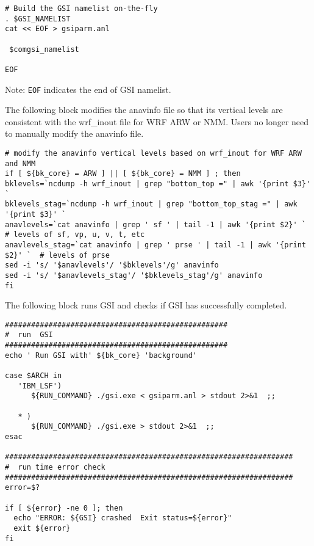 \begin{footnotesize}
\begin{verbatim}
# Build the GSI namelist on-the-fly
. $GSI_NAMELIST
cat << EOF > gsiparm.anl

 $comgsi_namelist

EOF
\end{verbatim}
\end{footnotesize}

Note: \verb|EOF| indicates the end of GSI namelist.

The following block modifies the anavinfo file so that its vertical levels are consistent with the wrf\_inout file for WRF ARW or NMM.  Users no longer need to manually modify the anavinfo file.
 
\begin{footnotesize}
\begin{verbatim}
# modify the anavinfo vertical levels based on wrf_inout for WRF ARW and NMM
if [ ${bk_core} = ARW ] || [ ${bk_core} = NMM ] ; then
bklevels=`ncdump -h wrf_inout | grep "bottom_top =" | awk '{print $3}' `
bklevels_stag=`ncdump -h wrf_inout | grep "bottom_top_stag =" | awk '{print $3}' `
anavlevels=`cat anavinfo | grep ' sf ' | tail -1 | awk '{print $2}' `  # levels of sf, vp, u, v, t, etc
anavlevels_stag=`cat anavinfo | grep ' prse ' | tail -1 | awk '{print $2}' `  # levels of prse
sed -i 's/ '$anavlevels'/ '$bklevels'/g' anavinfo
sed -i 's/ '$anavlevels_stag'/ '$bklevels_stag'/g' anavinfo
fi
\end{verbatim}
\end{footnotesize}

The following block runs GSI and checks if GSI has successfully completed. 

\begin{footnotesize}
\begin{verbatim}
###################################################
#  run  GSI
###################################################
echo ' Run GSI with' ${bk_core} 'background'

case $ARCH in
   'IBM_LSF')
      ${RUN_COMMAND} ./gsi.exe < gsiparm.anl > stdout 2>&1  ;;

   * )
      ${RUN_COMMAND} ./gsi.exe > stdout 2>&1  ;;
esac

##################################################################
#  run time error check
##################################################################
error=$?

if [ ${error} -ne 0 ]; then
  echo "ERROR: ${GSI} crashed  Exit status=${error}"
  exit ${error}
fi
\end{verbatim}
\end{footnotesize}

